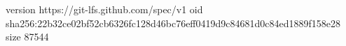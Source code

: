 version https://git-lfs.github.com/spec/v1
oid sha256:22b32ce02bf52cb6326fc128d46bc76eff0419d9c84681d0c84ed1889f158e28
size 87544
